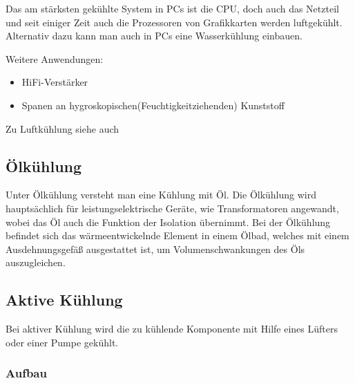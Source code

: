 Das am stärksten gekühlte System in PCs ist die CPU, doch auch das Netzteil und seit einiger Zeit auch die Prozessoren von Grafikkarten werden luftgekühlt. Alternativ dazu kann man auch in PCs eine Wasserkühlung einbauen.

Weitere Anwendungen:
\begin{itemize}
	\item HiFi-Verstärker 
	\item Spanen an hygroskopischen(Feuchtigkeitziehenden) Kunststoff
\end{itemize}

Zu Luftkühlung siehe auch \cite{Luftkuehlung1,Luftkuehlung2}


\subsection{Ölkühlung}

Unter Ölkühlung versteht man eine Kühlung mit Öl. Die Ölkühlung wird hauptsächlich für leistungselektrische Geräte, wie Transformatoren angewandt, wobei das Öl auch die Funktion der Isolation übernimmt. Bei der Ölkühlung befindet sich das wärmeentwickelnde Element in einem Ölbad, welches mit einem Ausdehnungsgefäß ausgestattet ist, um Volumenschwankungen des Öls auszugleichen.


\newpage

\subsection{Aktive Kühlung} 

Bei aktiver Kühlung wird die zu kühlende Komponente mit Hilfe eines Lüfters oder einer Pumpe gekühlt.
\subsubsection{Aufbau}


